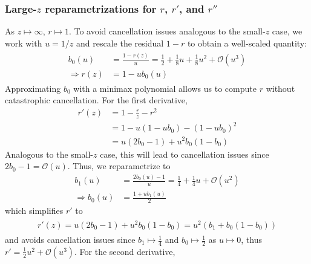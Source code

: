 \documentclass{article}
\begin{document}
\subsubsection{Large-$z$ reparametrizations for $r$, $r'$, and $r''$}\label{sec:bessel-ratio-large-z}

As $z \mapsto \infty$, $r \mapsto 1$.
To avoid cancellation issues analogous to the small-$z$ case, we work with $u=1/z$ and rescale the residual $1-r$ to obtain a well-scaled quantity:
%
\begin{align}
  \boxed{
    \begin{aligned}
      b_0(u)           & = \frac{1-r(z)}{u} = \frac{1}{2} + \frac{1}{8} u + \frac{1}{8} u^2 + \mathcal{O}(u^3) \\
      \Rightarrow r(z) & = 1 - u b_0(u) \label{eq:r-large-reparametrized}
    \end{aligned}
  }
\end{align}
%
Approximating $b_0$ with a minimax polynomial allows us to compute $r$ without catastrophic cancellation.
For the first derivative,
%
\begin{align}
  r'(z) & = 1 - \frac{r}{z} - r^2                                                     \\
        & = 1 - u(1 - u b_0) - (1 - u b_0)^2                                          \\
        & = u (2 b_0 - 1) + u^2 b_0 (1 - b_0) \label{eq:r-prime-large-reparametrized}
\end{align}
%
Analogous to the small-$z$ case, this will lead to cancellation issues since $2 b_0 - 1 = \mathcal{O}(u)$.
Thus, we reparametrize to
%
\begin{align}
  b_1(u)             & = \frac{2 b_0(u)-1}{u} = \frac{1}{4} + \frac{1}{4} u + \mathcal{O}(u^2) \\
  \Rightarrow b_0(u) & = \frac{1 + u b_1(u)}{2}
\end{align}
%
which simplifies $r'$ to
%
\begin{align}
  \boxed{
    \begin{aligned}
      r'(z) = u(2 b_0-1) + u^2 b_0(1-b_0) = u^2 (b_1 + b_0(1-b_0)) \label{eq:r-prime-large-reparametrized-simplified}
    \end{aligned}
  }
\end{align}
%
and avoids cancellation issues since $b_1 \mapsto \frac{1}{4}$ and $b_0 \mapsto \frac{1}{2}$ as $u \mapsto 0$, thus $r' = \frac{1}{2} u^2 + \mathcal{O}(u^3)$.
For the second derivative,
%
\end{document}
